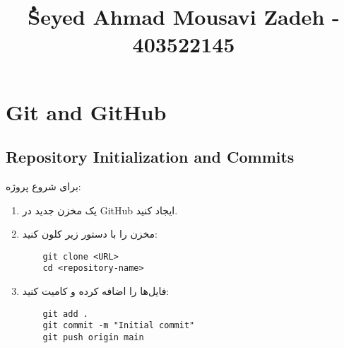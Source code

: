 \documentclass{article}
\begin{document}
\title{ُSeyed Ahmad Mousavi Zadeh - 403522145}

\section{Git and GitHub}

\subsection{Repository Initialization and Commits}
برای شروع پروژه:
\begin{enumerate}
    \item یک مخزن جدید در GitHub ایجاد کنید.
    \item مخزن را با دستور زیر کلون کنید:
    \begin{verbatim}
    git clone <URL>
    cd <repository-name>
    \end{verbatim}
    \item فایل‌ها را اضافه کرده و کامیت کنید:
    \begin{verbatim}
    git add .
    git commit -m "Initial commit"
    git push origin main
    \end{verbatim}
\end{enumerate}
\end{document}
